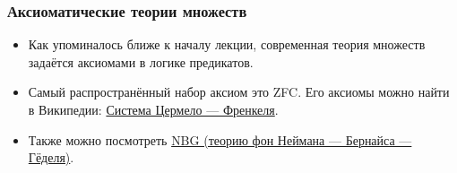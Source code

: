 \documentclass[10pt]{beamer}
\begin{document}
\begin{frame}
    \frametitle{Аксиоматические теории множеств}
    \begin{itemize}
        \item Как упоминалось ближе к началу лекции, современная теория множеств задаётся аксиомами в логике предикатов.
        \item Самый распространённый набор аксиом это ZFC. Его аксиомы можно найти в Википедии: \href{https://ru.wikipedia.org/wiki/Система_Цермело_—_Френкеля}{Система Цермело — Френкеля}.
        \item Также можно посмотреть \href{https://ru.wikipedia.org/wiki/Система_аксиом_фон_Неймана_—_Бернайса_—_Гёделя}{NBG (теорию фон Неймана — Бернайса — Гёделя)}.
    \end{itemize}
\end{frame}
\end{document}
